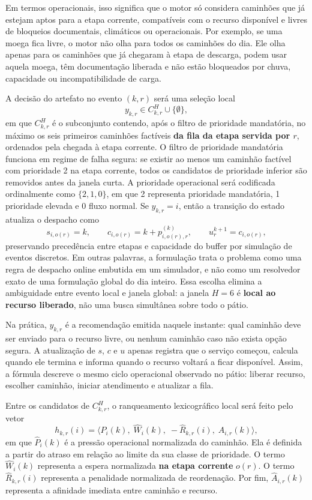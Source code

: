 \documentclass[
  12pt,
  oneside,
  a4paper,
  sumario=tradicional,
  brazil
]{abntex2}
\begin{document}
Em termos operacionais, isso significa que o motor s\'o considera caminh\~oes que j\'a estejam aptos para a etapa corrente, compat\'iveis com o recurso dispon\'ivel e livres de bloqueios documentais, clim\'aticos ou operacionais. Por exemplo, se uma moega fica livre, o motor n\~ao olha para todos os caminh\~oes do dia. Ele olha apenas para os caminh\~oes que j\'a chegaram \`a etapa de descarga, podem usar aquela moega, t\^em documenta\c{c}\~ao liberada e n\~ao est\~ao bloqueados por chuva, capacidade ou incompatibilidade de carga.

A decis\~ao do artefato no evento $(k,r)$ ser\'a uma sele\c{c}\~ao local
\[
y_{k,r} \in C_{k,r}^H \cup \{\emptyset\},
\]
em que $C_{k,r}^H$ \'e o subconjunto contendo, ap\'os o filtro de prioridade mandat\'oria, no m\'aximo os seis primeiros caminh\~oes fact\'iveis \textbf{da fila da etapa servida por $r$}, ordenados pela chegada \`a etapa corrente. O filtro de prioridade mandat\'oria funciona em regime de falha segura: se existir ao menos um caminh\~ao fact\'ivel com prioridade 2 na etapa corrente, todos os candidatos de prioridade inferior s\~ao removidos antes da janela curta. A prioridade operacional ser\'a codificada ordinalmente como $\{2,1,0\}$, em que 2 representa prioridade mandat\'oria, 1 prioridade elevada e 0 fluxo normal. Se $y_{k,r}=i$, ent\~ao a transi\c{c}\~ao do estado atualiza o despacho como
\[
s_{i,o(r)}=k,\qquad c_{i,o(r)}=k+p^{(k)}_{i,o(r),r},\qquad u_r^{k+1}=c_{i,o(r)},
\]
preservando preced\^encia entre etapas e capacidade do buffer por simula\c{c}\~ao de eventos discretos. Em outras palavras, a formula\c{c}\~ao trata o problema como uma regra de despacho online embutida em um simulador, e n\~ao como um resolvedor exato de uma formula\c{c}\~ao global do dia inteiro. Essa escolha elimina a ambiguidade entre evento local e janela global: a janela $H=6$ \'e \textbf{local ao recurso liberado}, n\~ao uma busca simult\^anea sobre todo o p\'atio.

Na pr\'atica, $y_{k,r}$ \'e a recomenda\c{c}\~ao emitida naquele instante: qual caminh\~ao deve ser enviado para o recurso livre, ou nenhum caminh\~ao caso n\~ao exista op\c{c}\~ao segura. A atualiza\c{c}\~ao de $s$, $c$ e $u$ apenas registra que o servi\c{c}o come\c{c}ou, calcula quando ele termina e informa quando o recurso voltar\'a a ficar dispon\'ivel. Assim, a f\'ormula descreve o mesmo ciclo operacional observado no p\'atio: liberar recurso, escolher caminh\~ao, iniciar atendimento e atualizar a fila.

Entre os candidatos de $C_{k,r}^H$, o ranqueamento lexicogr\'afico local ser\'a feito pelo vetor
\[
h_{k,r}(i)=\langle \widehat{P}_i(k),\; \widehat{W}_i(k),\; -\widehat{R}_{k,r}(i),\; \widehat{A}_{i,r}(k) \rangle,
\]
em que $\widehat{P}_i(k)$ \'e a press\~ao operacional normalizada do caminh\~ao. Ela \'e definida a partir do atraso em rela\c{c}\~ao ao limite da sua classe de prioridade. O termo $\widehat{W}_i(k)$ representa a espera normalizada \textbf{na etapa corrente} $o(r)$. O termo $\widehat{R}_{k,r}(i)$ representa a penalidade normalizada de reordena\c{c}\~ao. Por fim, $\widehat{A}_{i,r}(k)$ representa a afinidade imediata entre caminh\~ao e recurso.
\end{document}
